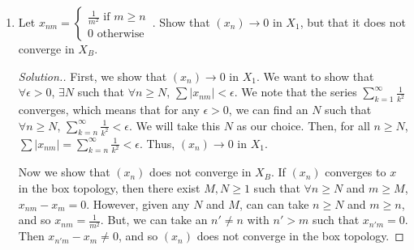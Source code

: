 \documentclass{article}
\newcommand{\sk}{\smallskip}
\begin{document}
\begin{enumerate}
\begin{enumerate}
\begin{proof}[Solution.]
            Now we show that $(x_n)$ does not converge in $X_1$. Convergence to $x$ in $X_1$ means that $\lim \sum |x_{nm} - x_{m}| = 0$. Fix some $N$. Then $\forall n \geq N$, $\sum_{m=2^{n-1}}^{2^n-1} \approx \log 2$. For a particular range $2^{n-1} \leq m < 2^n$, if we want $\sum|x_{nm} - x_{m}| = 0$, then we must have $x_m = \frac{1}{m}$. But since this applies to every such range, $x_{nm} = \frac{1}{m}$ for every $m$. If this was not that case, then for every $N$, we could find an $n \geq N$ such that $x_{nm} - x_m > 0$, and thus the sequence would not converge. However, if we let $x = \left(1, \frac{1}{2}, \frac{1}{3}, \dots \right)$, then $x \notin X_1$. This is because $\sum \frac{1}{m} = \infty$. Thus, $(x_n)$ cannot converge in $X_1$. 

            \end{proof}
            
            \item Let $x_{nm} = \begin{cases}
                \frac{1}{m^2} \text{ if } m \geq n \\
                0 \text{ otherwise }
            \end{cases}$. Show that $(x_n) \longrightarrow 0$ in $X_1$, but that it does not converge in $X_B$.

            \begin{proof}[Solution.]
            
            First, we show that $(x_n) \longrightarrow 0$ in $X_1$. We want to show that $\forall \epsilon > 0$, $\exists N$ such that $\forall n \geq N$, $\sum |x_{nm}| < \epsilon$. We note that the series $\sum_{k=1}^\infty \frac{1}{k^2}$ converges, which means that for any $\epsilon > 0$, we can find an $N$ such that $\forall n \geq N$, $\sum_{k=n}^\infty \frac{1}{k^2} < \epsilon$. We will take this $N$ as our choice. Then, for all $n\geq N$, $\sum |x_{nm}| = \sum_{k=n}^\infty \frac{1}{k^2} < \epsilon$. Thus, $(x_n) \longrightarrow 0$ in $X_1$.

            \sk

            Now we show that $(x_n)$ does not converge in $X_B$. If $(x_n)$ converges to $x$ in the box topology, then there exist $M, N \geq 1$ such that $\forall n \geq N$ and $m \geq M$, $x_{nm} - x_{m} = 0$. However, given any $N$ and $M$, can can take $n \geq N$ and $m \geq n$, and so $x_{nm} = \frac{1}{m^2}$. But, we can take an $n' \neq n$ with $n' > m$ such that $x_{n'm} = 0$. Then $x_{n'm} - x_m \neq 0$, and so $(x_n)$ does not converge in the box topology. 
            

\end{proof}
\end{enumerate}
\end{enumerate}
\end{document}
